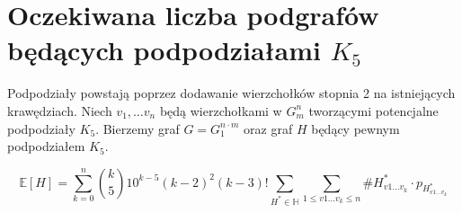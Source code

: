 \documentclass{article}
\begin{document}
\begin{figure}[h!]
  \centering
\end{figure}

\newpage

\section{Oczekiwana liczba podgrafów będących podpodziałami $K_5$}
Podpodziały powstają poprzez dodawanie wierzchołków stopnia 2 na istniejących krawędziach.
\newline
Niech $v_1, \ldots v_n$ będą wierzchołkami w $G_m^n$ tworzącymi potencjalne podpodziały $K_5$.
Bierzemy graf $G = G_1^{n \cdot m}$ oraz graf  $H$ będący pewnym podpodziałem $K_5$.

\begin{dmath}
  \mathbb{E}[H] = \sum_{k=0}^n \binom{k}{5}10^{k-5}(k-2)^2(k-3)! \sum_{H^* \in \mathbb{H}} \sum_{1 \leq v1 \ldots v_k \leq n} \#H_{v1 \ldots v_k}^* \cdot p_{H_{v1 \ldots v_k}^*}
\end{dmath}
\end{document}
